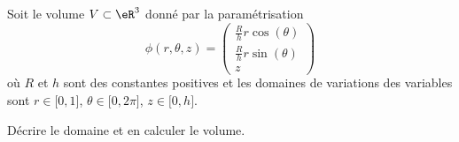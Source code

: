 
\begin{exercice}\label{exoOutilsMath-0116}

    Soit le volume $V\subset\eR^3$ donné par la paramétrisation
    \begin{equation}
        \phi(r,\theta,z)=\begin{pmatrix}
            \frac{ R }{ h }r\cos(\theta)    \\ 
            \frac{ R }{ h }r\sin(\theta)    \\ 
            z    
        \end{pmatrix}
    \end{equation}
    où $R$ et $h$ sont des constantes positives et les domaines de variations des variables sont $r\in\mathopen[ 0 , 1 \mathclose]$, $\theta\in\mathopen[ 0 , 2\pi \mathclose]$, $z\in\mathopen[ 0 , h \mathclose]$.

    Décrire le domaine et en calculer le volume.

\end{exercice}

